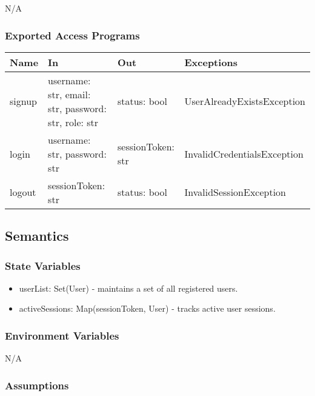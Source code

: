 \documentclass[12pt, titlepage]{article}
\begin{document}
N/A

\subsubsection{Exported Access Programs}

\begin{center}
\begin{tabular}{p{3cm} p{4cm} p{4cm} p{5cm}}
\hline
\textbf{Name} & \textbf{In} & \textbf{Out} & \textbf{Exceptions} \\
\hline
signup & \raggedright\arraybackslash username: str, email: str, password: str, role: str & \raggedright\arraybackslash status: bool & \raggedright\arraybackslash UserAlreadyExistsException \\
\hline
login & \raggedright\arraybackslash username: str, password: str & \raggedright\arraybackslash sessionToken: str & \raggedright\arraybackslash InvalidCredentialsException \\
\hline
logout & \raggedright\arraybackslash sessionToken: str & \raggedright\arraybackslash status: bool & \raggedright\arraybackslash InvalidSessionException \\
\hline
\end{tabular}
\end{center}


\subsection{Semantics}

\subsubsection{State Variables}

\begin{itemize}
\item userList: Set(User) - maintains a set of all registered users.
\item activeSessions: Map(sessionToken, User) - tracks active user sessions.
\end{itemize}

\subsubsection{Environment Variables}

N/A

\subsubsection{Assumptions}
\end{document}
